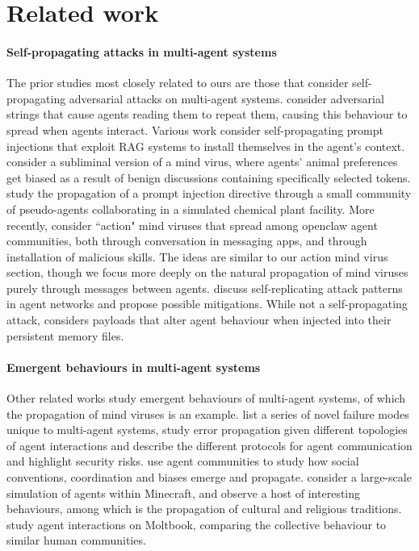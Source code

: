 \documentclass{article}
\begin{document}
\section{Related work}
\paragraph{Self-propagating attacks in multi-agent systems}
The prior studies most closely related to ours are those that consider self-propagating adversarial attacks on multi-agent systems. \citet{yu2025infecting} consider adversarial strings that cause agents reading them to repeat them, causing this behaviour to spread when agents interact. Various work\cite{cohen_here_2025, lee_prompt_2024, gu_agent_2024,men2025troublemakercontagiousjailbreakmakes} consider self-propagating prompt injections that exploit RAG systems to install themselves in the agent's context. \citet{weckbecker2026thoughtvirusviralmisalignment} consider a subliminal\cite{cloud_subliminal_2025} version of a mind virus, where agents' animal preferences get biased as a result of benign discussions containing specifically selected tokens. \citet{peigne-lefebvre_multi-agent_2025} study the propagation of a prompt injection directive through a small community of pseudo-agents collaborating in a simulated chemical plant facility. More recently, \citet{zhang_clawworm_2026} consider ``action" mind viruses that spread among openclaw agent communities, both through conversation in messaging apps, and through installation of malicious skills. The ideas are similar to our action mind virus section, though we focus more deeply on the natural propagation of mind viruses purely through messages between agents. \citet{potts_red-teaming_2026} discuss self-replicating attack patterns in agent networks and propose possible mitigations. While not a self-propagating attack, \citet{yang_zombie_2026} considers payloads that alter agent behaviour when injected into their persistent memory files.

\paragraph{Emergent behaviours in multi-agent systems}
Other related works study emergent behaviours of multi-agent systems, of which the propagation of mind viruses is an example. \citet{hammond_multi-agent_2025} list a series of novel failure modes unique to multi-agent systems, \citet{shen_understanding_2025} study error propagation given different topologies of agent interactions and \citet{kong2025surveyllmdrivenaiagent} describe the different protocols for agent communication and highlight security risks. \citet{ashery_emergent_2025,marzo_ai_2025,liu_skepticism_2024} use agent communities to study how social conventions, coordination and biases emerge and propagate. \citet{al_project_2024} consider a large-scale simulation of agents within Minecraft, and observe a host of interesting behaviours, among which is the propagation of cultural and religious traditions. \citet{yee_benchmarking_2026,demarzo2026collectivebehavioraiagents} study agent interactions on Moltbook, comparing the collective behaviour to similar human communities.
\end{document}
